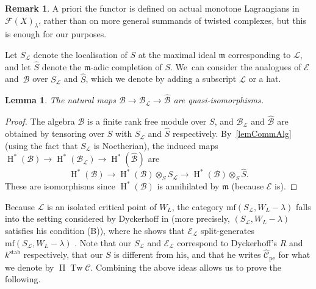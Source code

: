 \documentclass[JEP,XML,SOM,Unicode,NoEqCountersInSection,NoFloatCountersInSection,published]{cedram}
\newtheorem{lemma}[theorem]{Lemma}
\theoremstyle{definition}
\newtheorem{remark}[theorem]{Remark}
\newcommand{\hatS}{\widehat{S}}
\newcommand{\hatB}{\widehat{\calB}}
\newcommand{\calB}{\mathcal{B}}
\newcommand{\calC}{\mathcal{C}}
\newcommand{\calE}{\mathcal{E}}
\newcommand{\calL}{\mathcal{L}}
\newcommand{\Fuk}{\mathcal{F}}
\newcommand{\m}{\mathfrak{m}}
\newcommand{\mf}{\mathrm{mf}}
\newcommand{\rH}{\operatorname{H}}
\newcommand{\Tw}{\operatorname{Tw}}
\newcommand{\oPi}{\operatorname{\Pi}}
\newcommand{\PiTw}{\oPi \Tw}
\begin{document}
\begin{remark}
A priori the functor is defined on actual monotone Lagrangians in $\Fuk(X)_\lambda$, rather than on more general summands of twisted complexes, but this is enough for our purposes.
\end{remark}

Let $S_\calL$ denote the localisation of $S$ at the maximal ideal $\m$ corresponding to $\calL$, and let $\hatS$ denote the $\m$-adic completion of $S$. We~can consider the analogues of $\calE$ and~$\calB$ over $S_\calL$ and $\hatS$, which we denote by adding a subscript $\calL$ or a hat.

\begin{lemma}
\label{lemBqis}
The natural maps $\calB \to \calB_\calL \to \hatB$ are quasi-isomorphisms.
\end{lemma}

\begin{proof}
The algebra $\calB$ is a finite rank free module over $S$, and $\calB_\calL$ and $\hatB$ are obtained by tensoring over $S$ with $S_\calL$ and $\hatS$ respectively. By~\cref{lemCommAlg} (using the fact that $S_\calL$ is Noetherian), the induced maps $\rH^*(\calB) \to \rH^*(\calB_\calL) \to \rH^*(\hatB)$ are
\[
\rH^*(\calB) \to \rH^*(\calB) \otimes_S S_\calL \to \rH^*(\calB) \otimes_S \hatS.
\]
These are isomorphisms since $\rH^*(\calB)$ is annihilated by $\m$ (because $\calE$ is).
\end{proof}

Because $\calL$ is an isolated critical point of $W_L$, the category $\mf(S_\calL, W_L - \lambda)$ falls into the setting considered by Dyckerhoff in \cite{Dyckerhoff} (more precisely, $(S_\calL, W_L - \lambda)$ satisfies his condition (B)), where he shows that $\calE_\calL$ split-generates $\mf(S_\calL, W_L - \lambda)$ \cite[Cor.\,5.3]{Dyckerhoff}. Note that our $S_\calL$ and $\calE_\calL$ correspond to Dyckerhoff's $R$ and $k^\mathrm{stab}$ respectively, that our $S$ is different from his, and that he writes $\widehat{\calC}_\mathrm{pe}$ for what we denote by $\PiTw \calC$. Combining the above ideas allows us to prove the following.
\end{document}

